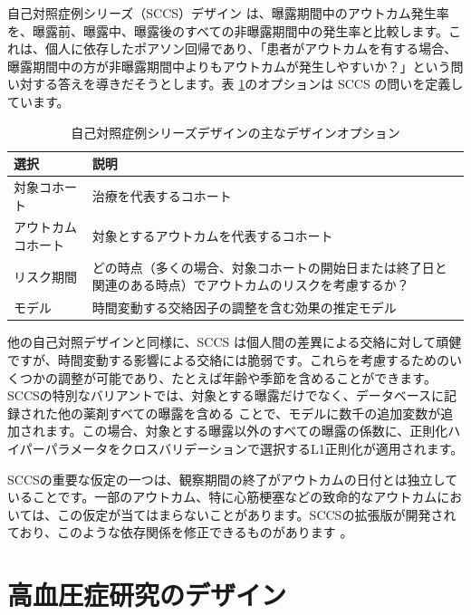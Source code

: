 \documentclass[
  11pt]{book}
\theoremstyle{definition}
\theoremstyle{definition}
\theoremstyle{definition}
\theoremstyle{definition}
\theoremstyle{remark}
\begin{document}
自己対照症例シリーズ（SCCS）デザイン \citep{farrington_1995, whitaker_2006} は、曝露期間中のアウトカム発生率を、曝露前、曝露中、曝露後のすべての非曝露期間中の発生率と比較します。これは、個人に依存したポアソン回帰であり、「患者がアウトカムを有する場合、曝露期間中の方が非曝露期間中よりもアウトカムが発生しやすいか？」という問い対する答えを導きだそうとします。表 \ref{tab:sccsChoices}のオプションは SCCS の問いを定義しています。  

\begin{table}
\centering
\caption{\label{tab:sccsChoices}自己対照症例シリーズデザインの主なデザインオプション}
\centering
\begin{tabular}[t]{l>{\raggedright\arraybackslash}p{9cm}}
\toprule
選択 & 説明\\
\midrule
対象コホート & 治療を代表するコホート\\
アウトカムコホート & 対象とするアウトカムを代表するコホート\\
リスク期間 & どの時点（多くの場合、対象コホートの開始日または終了日と関連のある時点）でアウトカムのリスクを考慮するか？\\
モデル & 時間変動する交絡因子の調整を含む効果の推定モデル\\
\bottomrule
\end{tabular}
\end{table}

他の自己対照デザインと同様に、SCCS は個人間の差異による交絡に対して頑健ですが、時間変動する影響による交絡には脆弱です。これらを考慮するためのいくつかの調整が可能であり、たとえば年齢や季節を含めることができます。SCCSの特別なバリアントでは、対象とする曝露だけでなく、データベースに記録された他の薬剤すべての曝露を含める \citep{simpson_2013}ことで、モデルに数千の追加変数が追加されます。この場合、対象とする曝露以外のすべての曝露の係数に、正則化ハイパーパラメータをクロスバリデーションで選択するL1正則化が適用されます。

SCCSの重要な仮定の一つは、観察期間の終了がアウトカムの日付とは独立していることです。一部のアウトカム、特に心筋梗塞などの致命的なアウトカムにおいては、この仮定が当てはまらないことがあります。SCCSの拡張版が開発されており、このような依存関係を修正できるものがあります \citep{farrington_2011}。

\section{高血圧症研究のデザイン}\label{ux9ad8ux8840ux5727ux75c7ux7814ux7a76ux306eux30c7ux30b6ux30a4ux30f3}
\end{document}
